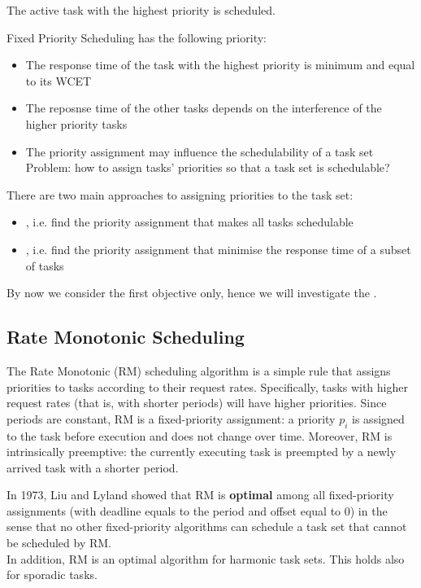 The active task with the highest priority is scheduled.

Fixed Priority Scheduling has the following priority:
\begin{itemize}
    \item The response time of the task with the highest priority is minimum and equal to its WCET
    \item The reposnse time of the other tasks depends on the interference of the higher priority tasks
    \item The priority assignment may influence the schedulability of a task set\\
    Problem: how to assign tasks' priorities so that a task set is schedulable?
\end{itemize}

There are two main approaches to assigning priorities to the task set:
\begin{itemize}
\item {}, i.e. find the priority assignment that makes all tasks schedulable
\item {}, i.e. find the priority assignment that minimise the response time of a subset of tasks
\end{itemize}
By now we consider the first objective only, hence we will investigate the .

\subsection{Rate Monotonic Scheduling}
The Rate Monotonic (RM) scheduling algorithm is a simple rule that assigns priorities to tasks according to their request rates. Specifically, tasks with higher request rates (that is, with shorter periods) will have higher priorities. Since periods are constant, RM is a fixed-priority assignment: a priority $p_i$ is assigned to the task before execution and does not change over time. Moreover, RM is intrinsically preemptive: the currently executing task is preempted by a newly arrived task with a shorter period.

In 1973, Liu and Lyland showed that RM is \textbf{optimal} among all fixed-priority assignments (with deadline equals to the period and offset equal to 0) in the sense that no other fixed-priority algorithms can schedule a task set that cannot be scheduled by RM.\\
In addition, RM is an optimal algorithm for harmonic task sets.
This holds also for sporadic tasks.


